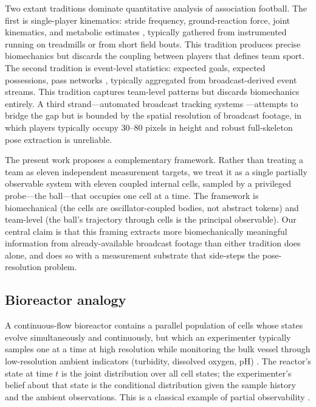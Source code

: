 \documentclass[11pt,twocolumn,a4paper]{article}
\theoremstyle{definition}
\theoremstyle{remark}
\begin{document}
Two extant traditions dominate quantitative analysis of association
football. The first is single-player kinematics: stride frequency,
ground-reaction force, joint kinematics, and metabolic estimates
\citep{cavagna1977,kram1990,novacheck1998,winter2009}, typically gathered
from instrumented running on treadmills or from short field bouts. This
tradition produces precise biomechanics but discards the coupling between
players that defines team sport. The second tradition is event-level
statistics: expected goals, expected possessions, pass networks
\citep{fernandez2018,decroos2019}, typically aggregated from
broadcast-derived event streams. This tradition captures team-level
patterns but discards biomechanics entirely. A third strand---automated
broadcast tracking systems \citep{theagarajan2021,dorazio2009}---attempts
to bridge the gap but is bounded by the spatial resolution of broadcast
footage, in which players typically occupy 30--80 pixels in height and
robust full-skeleton pose extraction is unreliable.

The present work proposes a complementary framework. Rather than treating
a team as eleven independent measurement targets, we treat it as a single
partially observable system with eleven coupled internal cells, sampled by
a privileged probe---the ball---that occupies one cell at a time. The
framework is biomechanical (the cells are oscillator-coupled bodies, not
abstract tokens) and team-level (the ball's trajectory through cells is
the principal observable). Our central claim is that this framing
extracts more biomechanically meaningful information from
already-available broadcast footage than either tradition does alone, and
does so with a measurement substrate that side-steps the pose-resolution
problem.

\subsection{Bioreactor analogy}

A continuous-flow bioreactor contains a parallel population of cells whose
states evolve simultaneously and continuously, but which an experimenter
typically samples one at a time at high resolution while monitoring the
bulk vessel through low-resolution ambient indicators (turbidity,
dissolved oxygen, pH) \citep{danckwerts1953,levenspiel1999,bailey1986}.
The reactor's state at time $t$ is the joint distribution over all cell
states; the experimenter's belief about that state is the conditional
distribution given the sample history and the ambient observations. This
is a classical example of partial observability
\citep{kalman1960,luenberger1971,kaelbling1998}.
\end{document}
